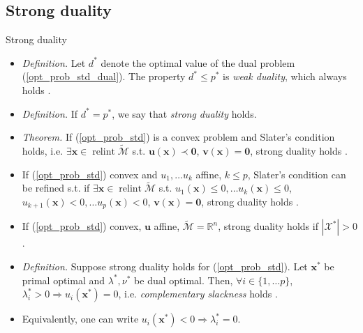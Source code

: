 \documentclass{beamer}
\numberwithin{equation}{section}
\newcommand{\aref}[1]{\alert{\ref{#1}}}
\begin{document}
\subsection{Strong duality}

\begin{frame}{Strong duality}
    \begin{itemize}
        \item
        \textit{Definition.} Let $ d^* $ denote the optimal value of the dual
        problem (\aref{opt_prob_std_dual}). The property $ d^* \le p^* $ is
        \textit{weak duality}, which always holds \cite{bv_convex_opt}.

        \item
        \textit{Definition.} If $ d^* = p^* $, we say that
        \textit{strong duality} holds.

        \item
        \textit{Theorem.} If (\aref{opt_prob_std}) is a convex problem and
        Slater's condition holds, i.e. $ \exists \mathbf{x} \in
        \operatorname{relint}\tilde{\mathcal{M}} $ s.t.
        $ \mathbf{u}(\mathbf{x}) \prec \mathbf{0} $,
        $ \mathbf{v}(\mathbf{x}) = \mathbf{0} $, strong duality holds
        \cite{bv_convex_opt}.

        \item
        If (\aref{opt_prob_std}) convex and $ u_1, \ldots u_k $ affine,
        $ k \le p $, Slater's condition can be refined s.t. if
        $ \exists \mathbf{x} \in
        \operatorname{relint}\tilde{\mathcal{M}} $ s.t.
        $ u_1(\mathbf{x}) \le 0, \ldots u_k(\mathbf{x}) \le 0 $,
        $ u_{k + 1}(\mathbf{x}) < 0, \ldots u_p(\mathbf{x}) < 0 $,
        $ \mathbf{v}(\mathbf{x}) = \mathbf{0} $, strong duality
        holds \cite{bv_convex_opt}.

        \item
        If (\aref{opt_prob_std}) convex, $ \mathbf{u} $ affine,
        $ \tilde{\mathcal{M}} = \mathbb{R}^n $, strong duality holds if
        $ |\mathcal{X}^*| > 0 $.

        \item
        \textit{Definition.} Suppose strong duality holds for
        (\aref{opt_prob_std}). Let $ \mathbf{x}^* $ be primal optimal and
        $ \lambda^*, \nu^* $ be
        dual optimal. Then, $ \forall i \in \{1, \ldots p\} $,
        $ \lambda_i^* > 0 \Rightarrow u_i(\mathbf{x}^*) = 0 $, i.e.
        \textit{complementary slackness} holds \cite{bv_convex_opt}.

        \item
        Equivalently, one can write $ u_i(\mathbf{x}^*) < 0 \Rightarrow
        \lambda_i^* = 0 $.
    \end{itemize}
\end{frame}
\end{document}
